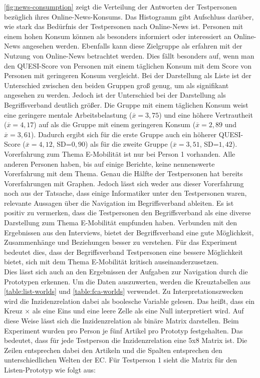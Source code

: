 \autoref{fig:news-consumption} zeigt die Verteilung der Antworten der Testpersonen bezüglich ihres Online-News-Konsums.
Das Histogramm gibt Aufschluss darüber, wie stark das Bedürfnis der Testpersonen nach Online-News ist.
Personen mit einem hohen Konsum können als besonders informiert oder interessiert an Online-News angesehen werden.
Ebenfalls kann diese Zielgruppe als erfahren mit der Nutzung von Online-News betrachtet werden.
Dies fällt besonders auf, wenn man den \ac{QUESI}-Score von Personen mit einem täglichen Konsum mit dem Score von Personen mit geringeren Konsum vergleicht.
Bei der Darstellung als Liste ist der Unterschied zwischen den beiden Gruppen groß genug, um als signifikant angesehen zu werden.
Jedoch ist der Unterschied bei der Darstellung als Begriffsverband deutlich größer.
Die Gruppe mit einem täglichen Konsum weist eine geringere mentale Arbeitsbelastung ($\overline{x} = 3,75$) und eine höhere Vertrautheit ($\overline{x} = 4,17$) auf als die Gruppe mit einem geringeren Konsum ($\overline{x} = 2,89$ und $\overline{x} = 3,61$).
Dadurch ergibt sich für die erste Gruppe auch ein höherer \ac{QUESI}-Score ($\overline{x} = 4,12$, SD=$0,90$) als für die zweite Gruppe ($\overline{x} = 3,51$, SD=$1,42$). \\

Vorerfahrung zum Thema E-Mobilität ist nur bei Person 1 vorhanden.
Alle anderen Personen haben, bis auf einige Berichte, keine nennenswerte Vorerfahrung mit dem Thema.
Genau die Hälfte der Testpersonen hat bereits Vorerfahrungen mit Graphen.
Jedoch lässt sich weder aus dieser Vorerfahrung noch aus der Tatsache, dass einige Informatiker unter den Testpersonen waren, relevante Aussagen über die Navigation im Begriffsverband ableiten.
Es ist positiv zu vermerken, dass die Testpersonen den Begriffsverband als eine diverse Darstellung zum Thema E-Mobilität empfunden haben.
Verbunden mit den Ergebnissen aus den Interviews, bietet der Begriffsverband eine gute Möglichkeit, Zusammenhänge und Beziehungen besser zu verstehen.
Für das Experiment bedeutet dies, dass der Begriffsverband Testpersonen eine bessere Möglichkeit bietet, sich mit dem Thema E-Mobilität kritisch auseinanderzusetzen. \\

Dies lässt sich auch an den Ergebnissen der Aufgaben zur Navigation durch die Prototypen erkennen.
Um die Daten auszuwerten, werden die Kreuztabellen aus \autoref{table:list-worlds} und \autoref{table:fca-worlds} verwendet.
Zu Interpretationszwecken wird die Inzidenzrelation dabei als boolesche Variable gelesen.
Das heißt, dass ein Kreuz $\times$ als eine Eins und eine leere Zelle als eine Null interpretiert wird.
Auf diese Weise lässt sich die Inzidenzrelation als binäre Matrix darstellen.
Beim Experiment wurden pro Person je fünf Artikel pro Prototyp festgehalten.
Das bedeutet, dass für jede Testperson die Inzidenzrelation eine 5x8 Matrix ist.
Die Zeilen entsprechen dabei den Artikeln und die Spalten entsprechen den unterschiedlichen Welten der \ac{EC}.
Für Testperson 1 sieht die Matrix für den Listen-Prototyp wie folgt aus:

